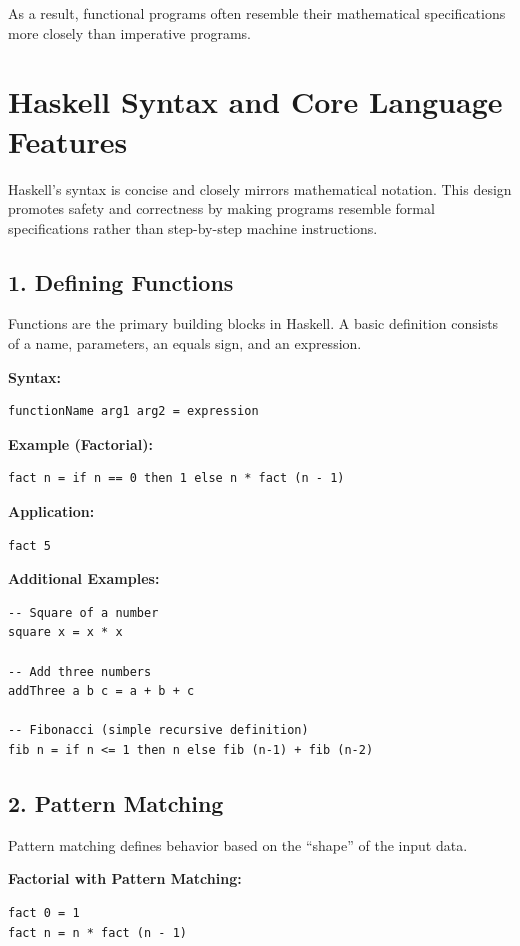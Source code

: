 \documentclass[12pt]{article}
\begin{document}
As a result, functional programs often resemble their mathematical specifications more closely than imperative programs.


\section{Haskell Syntax and Core Language Features}

Haskell’s syntax is concise and closely mirrors mathematical notation. This design promotes safety and correctness by making programs resemble formal specifications rather than step-by-step machine instructions.

\subsection{1. Defining Functions}

Functions are the primary building blocks in Haskell. A basic definition consists of a name, parameters, an equals sign, and an expression.

\textbf{Syntax:}
\begin{verbatim}
functionName arg1 arg2 = expression
\end{verbatim}

\textbf{Example (Factorial):}
\begin{verbatim}
fact n = if n == 0 then 1 else n * fact (n - 1)
\end{verbatim}

\textbf{Application:}
\begin{verbatim}
fact 5
\end{verbatim}

\textbf{Additional Examples:}

\begin{verbatim}
-- Square of a number
square x = x * x

-- Add three numbers
addThree a b c = a + b + c

-- Fibonacci (simple recursive definition)
fib n = if n <= 1 then n else fib (n-1) + fib (n-2)
\end{verbatim}

\subsection{2. Pattern Matching}

Pattern matching defines behavior based on the “shape” of the input data.

\textbf{Factorial with Pattern Matching:}
\begin{verbatim}
fact 0 = 1
fact n = n * fact (n - 1)
\end{verbatim}
\end{document}

